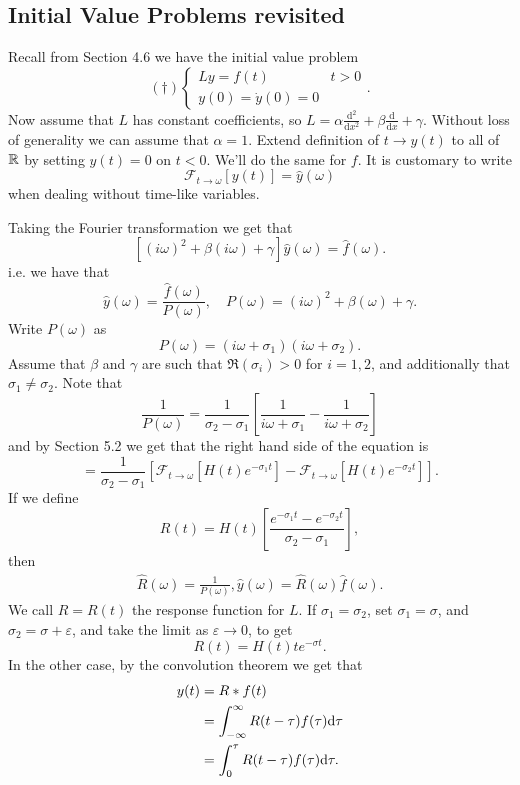 \documentclass{article}
\begin{document}
\subsection{Initial Value Problems revisited}
Recall from Section 4.6 we have the initial value problem
\[
	(\dagger)\begin{cases}
		Ly=f(t) & t>0 \\
		y(0)=\dot y(0)=0
	\end{cases}.
\]
Now assume that $ L $ has constant coefficients, so $ L=\alpha\frac{\mathrm d^2}{\mathrm dx^2}+\beta\frac{\mathrm d}{\mathrm dx}+\gamma $. Without loss of generality we can assume that $ \alpha=1 $. Extend definition of $ t\to y(t) $ to all of $ \mathbb{R} $ by setting $ y(t)=0 $ on $ t<0 $. We'll do the same for $ f $. It is customary to write \[ \mathcal F_{t\to\omega}[y(t)]=\hat y(\omega) \] when dealing without time-like variables.\par
Taking the Fourier transformation we get that
\[
	[(i\omega)^2+\beta(i\omega)+\gamma]\hat y(\omega)=\hat f(\omega).
\]
i.e. we have that
\[
	\hat y(\omega)=\frac{\hat f(\omega)}{P(\omega)},\quad P(\omega)=(i\omega)^2+\beta(\omega)+\gamma.
\]
Write $ P(\omega) $ as
\[
	P(\omega)=(i\omega+\sigma_1)(i\omega+\sigma_2).
\]
Assume that $ \beta $ and $ \gamma $ are such that $ \Re(\sigma_i)>0 $ for $ i=1,2 $, and additionally that $ \sigma_1\ne \sigma_2 $. Note that
\[
	\frac 1{P(\omega)}=\frac1{\sigma_2-\sigma_1}\left[\frac{1}{i\omega+\sigma_1}-\frac 1{i\omega+\sigma_2}\right]
\]
and by Section 5.2 we get that the right hand side of the equation is
\[
	=\frac{1}{\sigma_2-\sigma_1}\left[\mathcal F_{t\to \omega}[H(t)e^{-\sigma_1t}]-\mathcal{F}_{t\to \omega}[H(t)e^{-\sigma_2t}]\right].
\]
If we define
\[
	R(t)=H(t)\left[\frac{e^{-\sigma_1t}-e^{-\sigma_2t}}{\sigma_2-\sigma_1}\right],
\]
then
\begin{align*}
	\hat R(\omega)=\frac 1{P(\omega)},
	\hat y(\omega)=\hat R(\omega)\hat f(\omega).
\end{align*}
We call $ R=R(t) $ the response function for $ L $. If $ \sigma_1=\sigma_2 $, set $ \sigma_1=\sigma $, and $ \sigma_2=\sigma+\varepsilon $, and take the limit as $ \varepsilon\to 0 $, to get
\[
	R(t)=H(t)te^{-\sigma t}.
\]
In the other case, by the convolution theorem we get that
\begin{align*}
	y(t) &= R*f(t) \\
	     &= \int_{-\infty}^\infty R(t-\tau)f(\tau)\mathrm d\tau\\
	     &= \int_0^\tau R(t-\tau)f(\tau)\mathrm d\tau.
\end{align*}
\end{document}
